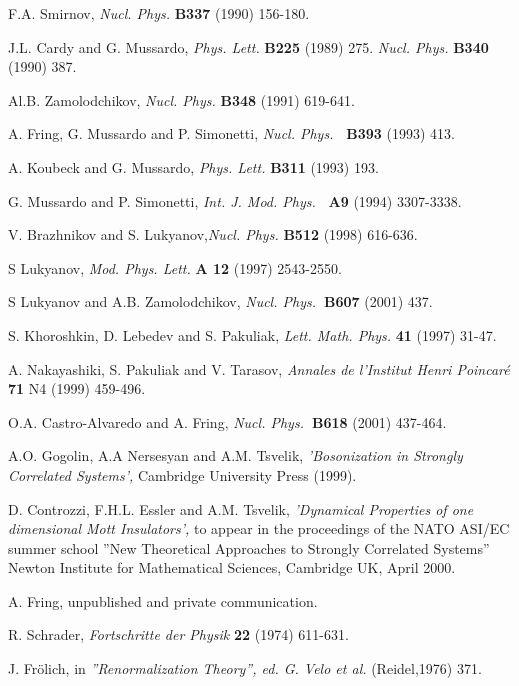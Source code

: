 \documentclass[a4paper,a4paper]{article}
\begin{document}
\begin{thebibliography}{99}
  F.A. Smirnov, \emph{Nucl. Phys.} \textbf{B337} (1990) 156-180.

  J.L. Cardy and G. Mussardo, \emph{Phys. Lett.} \textbf{B225}
(1989) 275. \emph{Nucl. Phys.} \textbf{B340} (1990) 387.

  Al.B. Zamolodchikov, \emph{Nucl. Phys. }\textbf{B348}
(1991) 619-641.

  A. Fring, G. Mussardo and P. Simonetti, \emph{Nucl. Phys.}%
\textbf{\ B393} (1993) 413.

  A. Koubeck and G. Mussardo, \emph{Phys. Lett. }\textbf{B311}
(1993) 193.

  G. Mussardo and P. Simonetti, \emph{Int. J. Mod. Phys.}\textbf{%
\ A9} (1994) 3307-3338.

  V. Brazhnikov and S. Lukyanov,\emph{Nucl. Phys.} \textbf{B512 }%
(1998) 616-636.

  S Lukyanov, \emph{Mod. Phys. Lett.} \textbf{A 12} (1997)
2543-2550.

  S Lukyanov and A.B. Zamolodchikov, \emph{Nucl. Phys.}\textbf{\
B607} (2001) 437.

  S. Khoroshkin, D. Lebedev and S. Pakuliak, \emph{Lett. Math.
Phys. }\textbf{41} (1997) 31-47.

  A. Nakayashiki, S. Pakuliak and V. Tarasov, \emph{Annales de
l'Institut Henri Poincar\'{e} }\textbf{71 }N4 (1999) 459-496.

  O.A. Castro-Alvaredo and A. Fring, \emph{Nucl. Phys.}\textbf{\
B618} (2001) 437-464.

  A.O. Gogolin, A.A Nersesyan and A.M. Tsvelik, \emph{%
'Bosonization in Strongly Correlated Systems', }Cambridge University Press
(1999).

  D. Controzzi, F.H.L. Essler and A.M. Tsvelik, \emph{%
'Dynamical Properties of one dimensional Mott Insulators', } to appear in
the proceedings of the NATO ASI/EC summer school ''New Theoretical
Approaches to Strongly Correlated Systems'' Newton Institute for
Mathematical Sciences, Cambridge UK, April 2000. %

\bibitem{Fr}  A. Fring, unpublished and private communication.

  R. Schrader, \emph{Fortschritte der Physik} \textbf{22 }%
(1974) 611-631.

  J. Fr\"{o}lich, in \emph{''Renormalization Theory'', ed. G.
Velo et al.} (Reidel,1976) 371.


\end{thebibliography}
\end{document}
